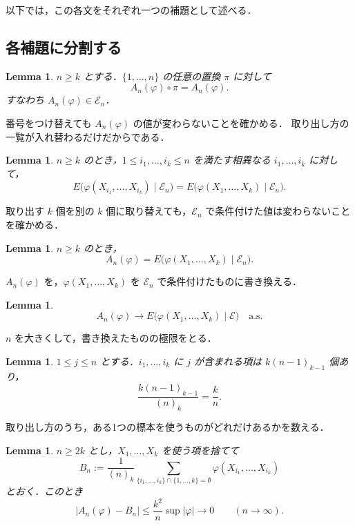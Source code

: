 \documentclass[a4paper,11pt,uplatex,dvipdfmx]{jsarticle}
\theoremstyle{plain}
\newtheorem{lemma}[theorem]{Lemma}
\theoremstyle{definition}
\begin{document}
以下では，この各文をそれぞれ一つの補題として述べる．

\subsection{各補題に分割する}

\begin{lemma}\label{lem:sym}
$n\ge k$ とする．$\{1,\dots,n\}$ の任意の置換 $\pi$ に対して
\[
  A_n(\varphi)\circ\pi=A_n(\varphi).
\]
すなわち $A_n(\varphi)\in\mathcal{E}_n$．
\end{lemma}

番号をつけ替えても $A_n(\varphi)$ の値が変わらないことを確かめる．
取り出し方の一覧が入れ替わるだけだからである．

\begin{lemma}\label{lem:same}
$n\ge k$ のとき，$1\le i_1,\dots,i_k\le n$ を満たす相異なる $i_1,\dots,i_k$ に対して，
\[
  E\bigl(\varphi(X_{i_1},\dots,X_{i_k})\mid\mathcal{E}_n\bigr)
  =E\bigl(\varphi(X_1,\dots,X_k)\mid\mathcal{E}_n\bigr).
\]
\end{lemma}

取り出す $k$ 個を別の $k$ 個に取り替えても，$\mathcal{E}_n$ で条件付けた値は変わらないことを確かめる．

\begin{lemma}\label{lem:rewrite}
$n\ge k$ のとき，
\begin{equation}\label{eq:star}
  A_n(\varphi)=E\bigl(\varphi(X_1,\dots,X_k)\mid\mathcal{E}_n\bigr).
\end{equation}
\end{lemma}

$A_n(\varphi)$ を，$\varphi(X_1,\dots,X_k)$ を $\mathcal{E}_n$ で条件付けたものに書き換える．

\begin{lemma}\label{lem:conv}
\[
  A_n(\varphi)\longrightarrow E\bigl(\varphi(X_1,\dots,X_k)\mid\mathcal{E}\bigr)\quad\text{a.s.}
\]
\end{lemma}

$n$ を大きくして，書き換えたものの極限をとる．

\begin{lemma}\label{lem:count}
$1\le j\le n$ とする．$i_1,\dots,i_k$ に $j$ が含まれる項は $k(n-1)_{k-1}$ 個あり，
\[
  \frac{k(n-1)_{k-1}}{(n)_k}=\frac{k}{n}.
\]
\end{lemma}

取り出し方のうち，ある1つの標本を使うものがどれだけあるかを数える．

\begin{lemma}\label{lem:approx}
$n\ge2k$ とし，$X_1,\dots,X_k$ を使う項を捨てて
\[
  B_n:=\frac{1}{(n)_k}\sum_{\{i_1,\dots,i_k\}\cap\{1,\dots,k\}=\emptyset}\varphi(X_{i_1},\dots,X_{i_k})
\]
とおく．このとき
\[
  \bigl|A_n(\varphi)-B_n\bigr|\le\frac{k^2}{n}\sup|\varphi|\longrightarrow0\qquad(n\to\infty).
\]
\end{lemma}
\end{document}
